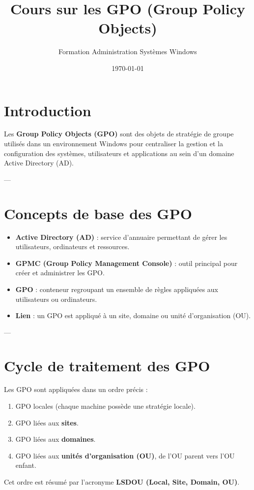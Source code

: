 \documentclass[a4paper,12pt]{article}
\title{Cours sur les GPO (Group Policy Objects)}
\author{Formation Administration Systèmes Windows}
\date{\today}
\begin{document}
\maketitle

\tableofcontents
\newpage

\section*{Introduction}
\begin{tcolorbox}[colback=blue!5!white,colframe=blue!75!black,title=Définition]
Les \textbf{Group Policy Objects (GPO)} sont des objets de stratégie de groupe utilisés dans un environnement Windows pour centraliser la gestion et la configuration des systèmes, utilisateurs et applications au sein d’un domaine Active Directory (AD).
\end{tcolorbox}

---

\section{Concepts de base des GPO}
\begin{tcolorbox}[colback=green!5!white,colframe=green!60!black,title=Composants fondamentaux]
\begin{itemize}
  \item \textbf{Active Directory (AD)} : service d'annuaire permettant de gérer les utilisateurs, ordinateurs et ressources.
  \item \textbf{GPMC (Group Policy Management Console)} : outil principal pour créer et administrer les GPO.
  \item \textbf{GPO} : conteneur regroupant un ensemble de règles appliquées aux utilisateurs ou ordinateurs.
  \item \textbf{Lien} : un GPO est appliqué à un site, domaine ou unité d'organisation (OU).
\end{itemize}
\end{tcolorbox}

---

\section{Cycle de traitement des GPO}
\begin{tcolorbox}[colback=orange!5!white,colframe=orange!80!black,title=Ordre d’application des stratégies]
Les GPO sont appliquées dans un ordre précis :
\begin{enumerate}
  \item GPO locales (chaque machine possède une stratégie locale).
  \item GPO liées aux \textbf{sites}.
  \item GPO liées aux \textbf{domaines}.
  \item GPO liées aux \textbf{unités d’organisation (OU)}, de l’OU parent vers l’OU enfant.
\end{enumerate}

Cet ordre est résumé par l’acronyme \textbf{LSDOU (Local, Site, Domain, OU)}.
\end{tcolorbox}
\end{document}
